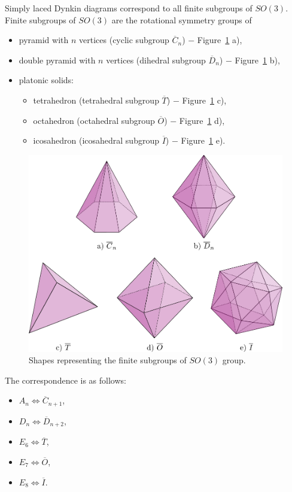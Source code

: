 Simply laced Dynkin diagrams correspond to all finite subgroups of
$SO(3)$. Finite subgroups of
$SO(3)$ are the rotational symmetry groups of
\begin{itemize}
    \item pyramid with $n$ vertices (cyclic subgroup $\overline{C}_n$) $-$ Figure~\ref{img:34} a),
    \item double pyramid with $n$ vertices (dihedral subgroup $\overline{D}_n$) $-$ Figure~\ref{img:34} b),
    \item platonic solids:
    \begin{itemize}
        \item tetrahedron (tetrahedral subgroup $\overline{T}$) $-$ Figure~\ref{img:34} c),
        \item octahedron (octahedral subgroup $\overline{O}$) $-$ Figure~\ref{img:34} d),
        \item icosahedron (icosahedral subgroup $\overline{I}$) $-$ Figure~\ref{img:34} e).
    \end{itemize}
\end{itemize}

\begin{figure}[h!]
    \centerline{\includegraphics[scale=0.5]{images/img34}}
    \caption[Shapes representing the finite subgroups of $SO(3)$ group]
    {Shapes representing the finite subgroups of $SO(3)$ group.}
    \label{img:34}
\end{figure}

The correspondence is as follows:
\begin{itemize}
    \item $A_n \iff \overline{C}_{n+1}$,
    \item $D_n \iff \overline{D}_{n+2}$,
    \item $E_6 \iff \overline{T}$,
    \item $E_7 \iff \overline{O}$,
    \item $E_8 \iff \overline{I}$.
\end{itemize}

